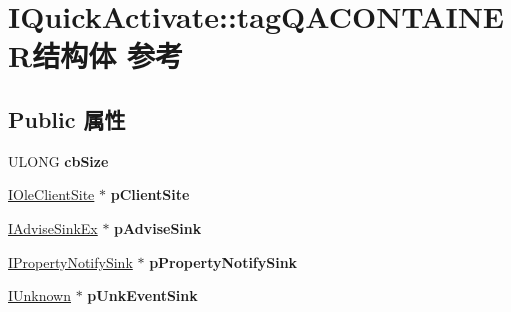 \hypertarget{struct_i_quick_activate_1_1tag_q_a_c_o_n_t_a_i_n_e_r}{}\section{I\+Quick\+Activate\+:\+:tag\+Q\+A\+C\+O\+N\+T\+A\+I\+N\+E\+R结构体 参考}
\label{struct_i_quick_activate_1_1tag_q_a_c_o_n_t_a_i_n_e_r}
\subsection*{Public 属性}
\begin{DoxyCompactItemize}
\item 
\mbox{\label{struct_i_quick_activate_1_1tag_q_a_c_o_n_t_a_i_n_e_r_ae7a4d08c1714bc74e046d1e57355c37a}} 
U\+L\+O\+NG {\bfseries cb\+Size}
\item 
\mbox{\label{struct_i_quick_activate_1_1tag_q_a_c_o_n_t_a_i_n_e_r_a0d9b1930ef7b78eada2d76580cd8d9b7}} 
\hyperlink{interface_i_ole_client_site}{I\+Ole\+Client\+Site} $\ast$ {\bfseries p\+Client\+Site}
\item 
\mbox{\label{struct_i_quick_activate_1_1tag_q_a_c_o_n_t_a_i_n_e_r_a9f6a4841b4c7ea4373370942d02a1266}} 
\hyperlink{interface_i_advise_sink_ex}{I\+Advise\+Sink\+Ex} $\ast$ {\bfseries p\+Advise\+Sink}
\item 
\mbox{\label{struct_i_quick_activate_1_1tag_q_a_c_o_n_t_a_i_n_e_r_ab2ee42c63d30fa666aeeebe813d312e1}} 
\hyperlink{interface_i_property_notify_sink}{I\+Property\+Notify\+Sink} $\ast$ {\bfseries p\+Property\+Notify\+Sink}
\item 
\mbox{\label{struct_i_quick_activate_1_1tag_q_a_c_o_n_t_a_i_n_e_r_ae020dbd7dec09a2f9acc7dd82ef092bf}} 
\hyperlink{interface_i_unknown}{I\+Unknown} $\ast$ {\bfseries p\+Unk\+Event\+Sink}
\item 
\mbox{\label{struct_i_quick_activate_1_1tag_q_a_c_o_n_t_a_i_n_e_r_abb1139baea5d788453148ef5fb4533e4}} 

\end{DoxyCompactItemize}
